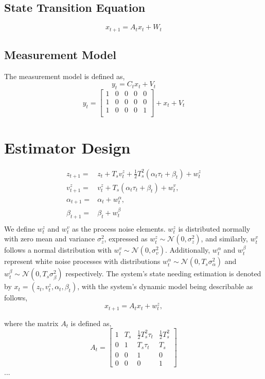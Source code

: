 \documentclass{article}
\begin{document}
\subsection{State Transition Equation}
\begin{equation}
    {x}_{t+1} = A_t {x}_t + W_t
\end{equation}

\subsection{Measurement Model}
The measurement model is defined as,
\begin{equation}
y_t = C_t x_t + V_t
\end{equation}
\begin{equation}
    y_t  = 
    \begin{bmatrix}
        1 & 0 & 0 & 0 & 0 \\
        1 & 0 & 0 & 0 & 0 \\
        1 & 0 & 0 & 0 & 1 \\
    \end{bmatrix}
    + x_t + V_t
\end{equation}

\section{Estimator Design}
\begin{align}
    z_{t+1} =& z_t + T_s v_t^z + \frac{1}{2} T_s^2 (\alpha_t \tau_t + \beta_t) + w_t^z\\
    v_{t+1}^z =& v_t^z + T_s (\alpha_t \tau_t + \beta_t) + w_t^v,\\
    \alpha_{t+1} =& \alpha_t + w_t^\alpha,\\
    \beta_{t+1} =& \beta_t + w_t^\beta\\
\end{align}
\noindent
We define $w_t^z$ and $w_t^v$ as the process noise elements.
$w_t^z$ is distributed normally with zero mean and variance
$\sigma_z^2$, expressed as $w_t^z \sim \mathcal{N}(0, \sigma_z^2)$, 
and similarly, $w_t^v$ follows a normal distribution with $w_t^v \sim \mathcal{N}(0, \sigma_v^2)$.
Additionally, $w_t^\alpha$ and $w_t^\beta$ represent white noise processes with distributions
$w_t^\alpha \sim \mathcal{N}(0, T_s \sigma_\alpha^2)$ and $w_t^\beta \sim \mathcal{N}(0, T_s \sigma_\beta^2)$ 
respectively. The system's state needing estimation is denoted by $x_t = (z_t, v_t^z, \alpha_t, \beta_t)$, 
with the system's dynamic model being describable as follows,
\begin{equation}
    x_{t+1} = A_t x_t + w_t^z,
\end{equation}

where the matrix $A_t$ is defined as,
\begin{equation}
    A_t = 
    \begin{bmatrix}
    1 & T_s & \frac{1}{2} T_s^2 \tau_t & \frac{1}{2} T_s^2 \\
    0 & 1 & T_s \tau_t & T_s \\
    0 & 0 & 1 & 0 \\
    0 & 0 & 0 & 1
    \end{bmatrix}
\end{equation}
\noindent
...
\end{document}
